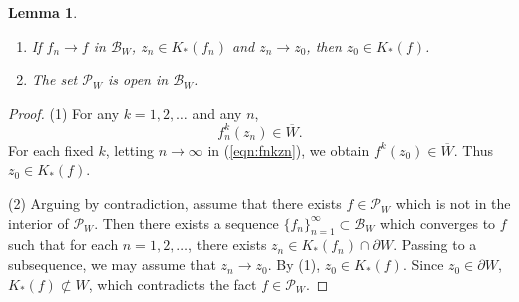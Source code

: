 \documentclass{amsart}
\numberwithin{equation}{section}
\newtheorem{lemma}[theorem]{Lemma}%
\theoremstyle{definition}
\theoremstyle{remark}
\begin{document}
\begin{lemma} \label{lem:K*cont}
\begin{enumerate}
\item If $f_n\to f$ in $\mathcal{B}_W$, $z_n\in K_*(f_n)$ and $z_n\to z_0$, then 
$z_0\in K_*(f)$.
\item The set $\mathcal{P}_W$ is open in $\mathcal{B}_W$.
\end{enumerate}
\end{lemma}
\begin{proof}
(1) For any $k=1,2,\dots$ and any $n$,
\begin{equation}\label{eqn:fnkzn}
f_n^k(z_n)\in \overline{W}.
\end{equation}
For each fixed $k$, letting $n\to\infty$ in (\ref{eqn:fnkzn}), we obtain 
$f^k(z_0)\in \overline{W}$. Thus $z_0\in K_*(f)$.

(2) Arguing by contradiction, assume that there exists $f\in \mathcal{P}_W$ which is not in the interior of $\mathcal{P}_W$. Then there exists a sequence $\{f_n\}_{n=1}^\infty \subset \mathcal{B}_W$ which converges to $f$ such that for each $n=1,2,\ldots$, there exists $z_n\in K_*(f_n)\cap \partial W$. 
Passing to a subsequence, we may assume that $z_n\to z_0$. 
By (1), $z_0\in K_*(f)$. Since $z_0\in \partial W$, $K_*(f)\not\subset W$, which contradicts the fact $f\in \mathcal{P}_{W}$. 
\end{proof}
\end{document}
